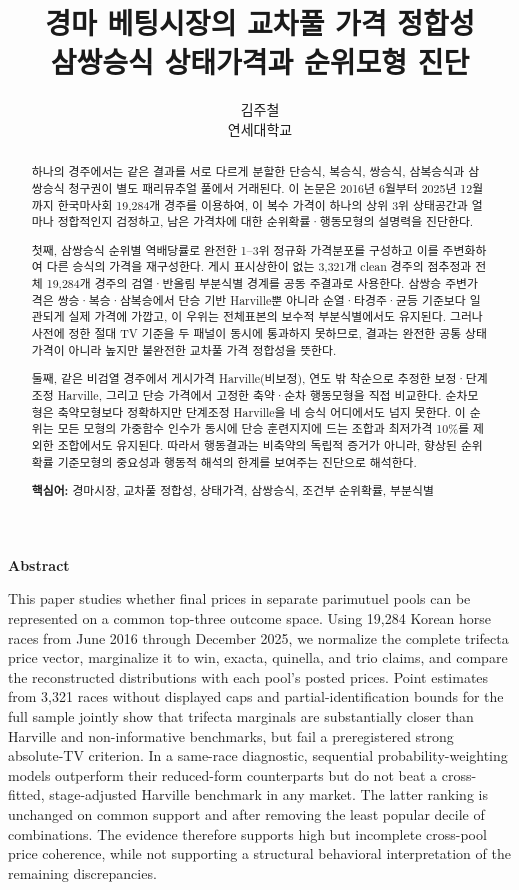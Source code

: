 \documentclass[11pt]{article}
\title{\textbf{경마 베팅시장의 교차풀 가격 정합성}\\
  \large 삼쌍승식 상태가격과 순위모형 진단}
\author{김주철\\\small 연세대학교}
\date{}
\begin{document}
\maketitle

\begin{abstract}
하나의 경주에서는 같은 결과를 서로 다르게 분할한 단승식, 복승식, 쌍승식,
삼복승식과 삼쌍승식 청구권이 별도 패리뮤추얼 풀에서 거래된다. 이 논문은
2016년 6월부터 2025년 12월까지 한국마사회 19,284개 경주를 이용하여, 이
복수 가격이 하나의 상위 3위 상태공간과 얼마나 정합적인지 검정하고, 남은
가격차에 대한 순위확률·행동모형의 설명력을 진단한다.

첫째, 삼쌍승식 순위별 역배당률로 완전한 1--3위 정규화 가격분포를 구성하고
이를 주변화하여 다른 승식의 가격을 재구성한다. 게시 표시상한이 없는 3,321개
clean 경주의 점추정과 전체 19,284개 경주의 검열·반올림 부분식별 경계를
공동 주결과로 사용한다. 삼쌍승 주변가격은 쌍승·복승·삼복승에서 단승 기반
Harville뿐 아니라 순열·타경주·균등 기준보다 일관되게 실제 가격에 가깝고,
이 우위는 전체표본의 보수적 부분식별에서도 유지된다. 그러나 사전에 정한
절대 TV 기준을 두 패널이 동시에 통과하지 못하므로, 결과는 완전한 공통
상태가격이 아니라 높지만 불완전한 교차풀 가격 정합성을 뜻한다.

둘째, 같은 비검열 경주에서 게시가격 Harville(비보정), 연도 밖 착순으로 추정한 보정·단계조정
Harville, 그리고 단승 가격에서 고정한 축약·순차 행동모형을 직접 비교한다.
순차모형은 축약모형보다 정확하지만 단계조정 Harville을 네 승식 어디에서도
넘지 못한다. 이 순위는 모든 모형의 가중함수 인수가 동시에 단승 훈련지지에
드는 조합과 최저가격 10\%를 제외한 조합에서도 유지된다. 따라서 행동결과는
비축약의 독립적 증거가 아니라, 향상된 순위확률 기준모형의 중요성과 행동적
해석의 한계를 보여주는 진단으로 해석한다.

\medskip
\noindent\textbf{핵심어:} 경마시장, 교차풀 정합성, 상태가격, 삼쌍승식,
조건부 순위확률, 부분식별
\end{abstract}

\begin{center}\small\textbf{Abstract}\end{center}
\noindent\small
This paper studies whether final prices in separate parimutuel pools can be represented
on a common top-three outcome space. Using 19,284 Korean horse races from June 2016
through December 2025, we normalize the complete trifecta price vector, marginalize it
to win, exacta, quinella, and trio claims, and compare the reconstructed distributions
with each pool's posted prices. Point estimates from 3,321 races without displayed caps
and partial-identification bounds for the full sample jointly show that trifecta
marginals are substantially closer than Harville and non-informative benchmarks, but
fail a preregistered strong absolute-TV criterion. In a same-race diagnostic, sequential
probability-weighting models outperform their reduced-form counterparts but do not beat
a cross-fitted, stage-adjusted Harville benchmark in any market. The latter ranking is
unchanged on common support and after removing the least popular decile of combinations.
The evidence therefore supports high but incomplete cross-pool price coherence, while
not supporting a structural behavioral interpretation of the remaining discrepancies.
\end{document}
